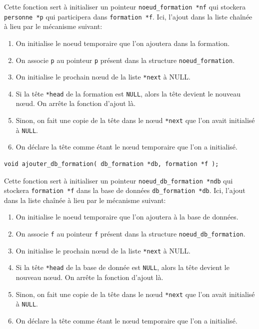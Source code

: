 \documentclass[11pt]{article}
\begin{document}
Cette fonction sert à initialiser un pointeur \texttt{noeud\_formation *nf} qui stockera \texttt{personne *p} qui participera dans \texttt{formation *f}. Ici, l'ajout dans la liste chaînée à lieu par le mécanisme suivant:
\begin{enumerate}
\item On initialise le noeud temporaire que l'on ajoutera dans la formation.
\item On associe \texttt{p} au pointeur \texttt{p} présent dans la structure \texttt{noeud\_formation}.
\item On initialise le prochain n\oe{}ud de la liste \texttt{*next} à NULL.
\item Si la tête \texttt{*head} de la formation est \texttt{NULL}, alors la tête devient le nouveau n\oe{}ud. On arrête la fonction d'ajout là.
\item Sinon, on fait une copie de la tête dans le n\oe{}ud \texttt{*next} que l'on avait initialisé à \texttt{NULL}.
\item On déclare la tête comme étant le n\oe{}ud temporaire que l'on a initialisé.
\end{enumerate}

\begin{lstlisting}[firstnumber=461]
  void ajouter_db_formation( db_formation *db, formation *f );
\end{lstlisting}

Cette fonction sert à initialiser un pointeur \texttt{noeud\_db\_formation *ndb} qui stockera \texttt{formation *f} dans la base de données \texttt{db\_formation *db}. Ici, l'ajout dans la liste chaînée à lieu par le mécanisme suivant:
\begin{enumerate}
\item On initialise le noeud temporaire que l'on ajoutera à la base de données.
\item On associe \texttt{f} au pointeur \texttt{f} présent dans la structure \texttt{noeud\_db\_formation}.
\item On initialise le prochain n\oe{}ud de la liste \texttt{*next} à NULL.
\item Si la tête \texttt{*head} de la base de donnée est \texttt{NULL}, alors la tête devient le nouveau n\oe{}ud. On arrête la fonction d'ajout là.
\item Sinon, on fait une copie de la tête dans le n\oe{}ud \texttt{*next} que l'on avait initialisé à \texttt{NULL}.
\item On déclare la tête comme étant le n\oe{}ud temporaire que l'on a initialisé.
\end{enumerate}
\end{document}
